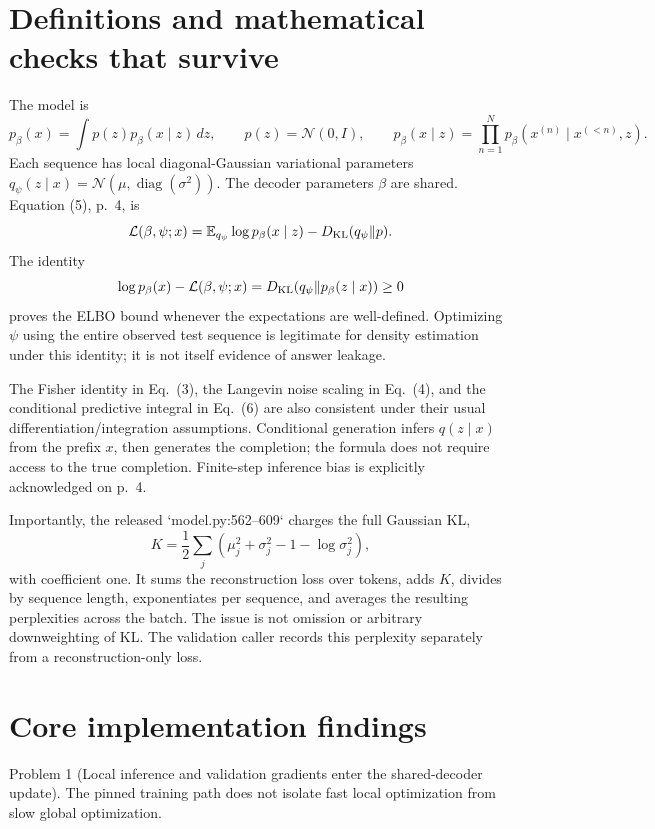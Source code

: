 \documentclass[10pt]{article}
\begin{document}
\section*{Definitions and mathematical checks that survive}
The model is \[p_\beta(x)=\int p(z)p_\beta(x\mid z)\,dz,\qquad
 p(z)=\mathcal N(0,I),\qquad
 p_\beta(x\mid z)=\prod_{n=1}^N
 p_\beta(x^{(n)}\mid x^{(<n)},z).\] Each sequence has local diagonal-Gaussian variational parameters \(q_\psi(z\mid x)=\mathcal N(\mu,\operatorname{diag}(\sigma^2))\). The decoder parameters \(\beta\) are shared. Equation (5), p. 4, is \[\mathcal L(\beta,\psi;x)
 =\mathbb E_{q_\psi}\log p_\beta(x\mid z)
  -D_{\rm KL}(q_\psi\|p).\] The identity \[\log p_\beta(x)-\mathcal L(\beta,\psi;x)
 =D_{\rm KL}(q_\psi\|p_\beta(z\mid x))\ge0\] proves the ELBO bound whenever the expectations are well-defined. Optimizing \(\psi\) using the entire observed test sequence is legitimate for density estimation under this identity; it is not itself evidence of answer leakage.\par
The Fisher identity in Eq. (3), the Langevin noise scaling in Eq. (4), and the conditional predictive integral in Eq. (6) are also consistent under their usual differentiation/integration assumptions. Conditional generation infers \(q(z\mid x)\) from the prefix \(x\), then generates the completion; the formula does not require access to the true completion. Finite-step inference bias is explicitly acknowledged on p. 4.\par
Importantly, the released `model.py:562--609` charges the full Gaussian KL, \[K=\frac12\sum_j(\mu_j^2+\sigma_j^2-1-\log\sigma_j^2),\] with coefficient one. It sums the reconstruction loss over tokens, adds \(K\), divides by sequence length, exponentiates per sequence, and averages the resulting perplexities across the batch. The issue is not omission or arbitrary downweighting of KL. The validation caller records this perplexity separately from a reconstruction-only loss.\par
\section*{Core implementation findings}
Problem 1 (Local inference and validation gradients enter the shared-decoder update).  The pinned training path does not isolate fast local optimization from slow global optimization.\par
\end{document}
